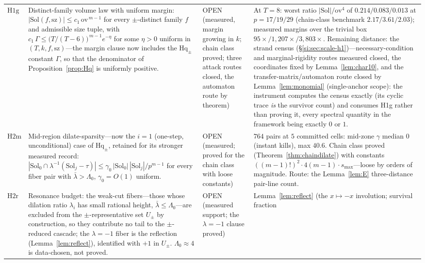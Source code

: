 \documentclass[11pt,a4paper]{article}
\numberwithin{equation}{section}
\theoremstyle{plain}
\theoremstyle{plain}
\theoremstyle{definition}
\theoremstyle{remark}
\begin{document}
{\begin{longtable}{@{}p{}p{}
                   p{}p{}@{}}
$\mathrm{H1g}$ &
Distinct-family volume law with uniform margin:
$|\mathrm{Sol}(f,\mathrm{sz})|\le c_1\,\mathrm{ov}^{\,m-1}$ for every
$\pm$-distinct family $f$ and admissible size tuple, with
$c_1\,\Gamma\le\bigl(T/(T-6)\bigr)^{\,m-1}e^{-\eta}$ for some $\eta>0$ uniform
in $(T,k,f,\mathrm{sz})$---the margin clause now includes the $\mathrm{Hq}_\pm$
constant $\Gamma$, so that the denominator of Proposition~\ref{prop:Hq} is
uniformly positive. &
OPEN (measured, margin growing in $k$; chain class proved; three
attack routes closed, the automaton route by theorem) &
At $T=8$: worst ratio $|\mathrm{Sol}|/\mathrm{ov}^4$ of
$0.214/0.083/0.013$ at $p=17/19/29$ (chain-class benchmark
$2.17/3.61/2.03$); measured margins over the trivial box
$95\times/1{,}207\times/3{,}803\times$. Remaining distance: the strand
census (\S\ref{si:sec:scale-h1})---necessary-condition and
marginal-rigidity routes measured closed, the coordinates fixed by
Lemma~\ref{lem:char10}, and the transfer-matrix/automaton route closed
by Lemma~\ref{lem:monomial} (single-anchor scope): the instrument computes
the census exactly (its cyclic trace \emph{is} the survivor count) and
consumes H1g rather than proving it, every spectral quantity in the
framework being exactly $0$ or $1$. \\
$\mathrm{H2m}$ &
Mid-region dilate-sparsity---now the $i=1$ (one-step, unconditional) case of
$\mathrm{Hq}_\pm$, retained for its stronger measured record:
$|\mathrm{Sol}_0\cap\lambda^{-1}(\mathrm{Sol}_j-\tau)|\le
\gamma_0\,|\mathrm{Sol}_0|\,|\mathrm{Sol}_j|/p^{m-1}$ for every fiber
pair with $\bar\lambda>\Lambda_0$, $\gamma_0=O(1)$ uniform. &
OPEN (measured; proved for the chain class with loose constants) &
$764$ pairs at $5$ committed cells: mid-zone $\gamma$ median $0$
(instant kills), max $40.6$. Chain class proved
(Theorem~\ref{thm:chaindilate}) with constants $((m-1)!)^2\cdot 4(m-1)\cdot
s_{\max}$---loose by orders of magnitude. Route: the
Lemma~\ref{lem:E} three-distance pair-line count. \\
$\mathrm{H2r}$ &
Resonance budget: the weak-cut fibers---those whose dilation ratio
$\lambda_i$ has small rational height, $\bar\lambda\le\Lambda_0$---are
excluded from the $\pm$-representative set $U_\pm$ by construction, so they
contribute no tail to the $\pm$-reduced cascade; the $\lambda=-1$ fiber is
the reflection (Lemma~\ref{lem:reflect}), identified with $+1$ in $U_\pm$.
$\Lambda_0\approx 4$ is data-chosen, not proved. &
OPEN (measured support; the $\lambda=-1$ clause proved) &
Lemma~\ref{lem:reflect} (the $x\mapsto-x$ involution; survival fraction

\end{longtable}}
\end{document}
